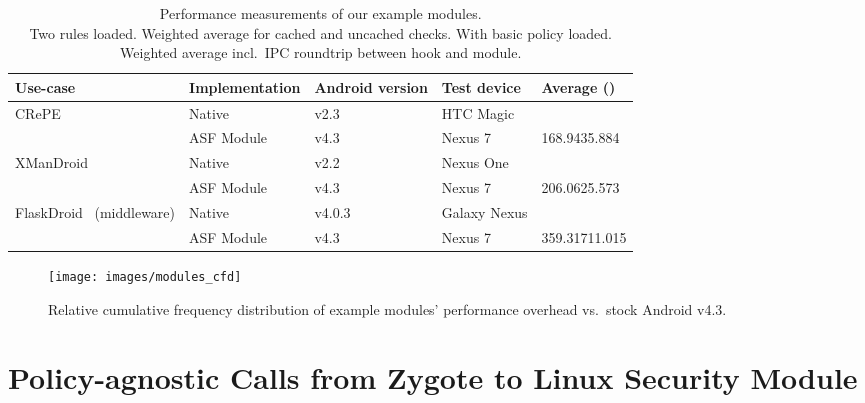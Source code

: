 \documentclass[letterpaper,twocolumn,10pt]{article}
\newcommand{\OURSHORT}{\textsc{ASF}\xspace}
\begin{document}
\begin{table*}[h]
  \centering
  \begin{tabular}{|l|l|l|l|l|}\hline
    \textbf{Use-case} & \textbf{Implementation} & \textbf{Android version} & \textbf{Test device} & \textbf{Average ()}\\\hline\hline
\multirow{2}{*}{CRePE~\cite{CoNgCr_10:CRePE}} & Native & v2.3 & HTC Magic &  \\\cline{2-5}
 & \OURSHORT Module & v4.3 & Nexus 7 & 168.9435.884 \\\hline\hline
\multirow{2}{*}{XManDroid~\cite{BuDaDm_12:TowardsT}} & Native & v2.2 & Nexus One &  \\\cline{2-5}
& \OURSHORT Module & v4.3 & Nexus 7 & 206.0625.573\\\hline\hline
\multirow{2}{*}{FlaskDroid~\cite{TUD-CS-2013-0115} (middleware)} & Native & v4.0.3 & Galaxy Nexus &  \\\cline{2-5}
& \OURSHORT Module & v4.3 & Nexus 7 & 359.31711.015 \\\hline
  \end{tabular}
\captionsetup{justification=centering,
}
  \caption{Performance measurements of our example modules.\\
    {\small\textnormal{ Two rules loaded.}} {\small\textnormal{ Weighted average for cached and uncached checks.}} {\small\textnormal { With basic policy loaded.}}\\{\small\textnormal { Weighted average incl.~IPC roundtrip between hook and module.}} }
  \label{tab:moduleperf}
\end{table*}

\begin{figure*}[h]
  \centering
  \texttt{[image: images/modules\_cfd]}
  \caption{Relative cumulative frequency distribution of example modules' performance overhead vs.~stock Android v4.3.}
  \label{fig:appendix:cfdmodules}
\end{figure*}


\twocolumn

\section{Policy-agnostic Calls from Zygote to Linux Security Module}
\label{sec:appendix:kmacexample}
\end{document}
